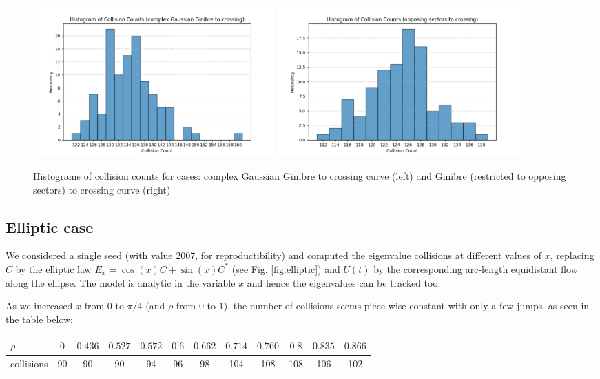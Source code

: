 \documentclass{article}
\begin{document}
\begin{enumerate}
		\begin{figure}[htbp]
			\centering
			\includegraphics[width=0.45\textwidth]{figures/ComplexGaussianToCrossing.pdf}
			\includegraphics[width=0.45\textwidth]{figures/Opposing-sectors-to-crossing.pdf}	
			\caption{Histograms of collision counts for cases: complex Gaussian Ginibre 
			to crossing curve (left) and 
			Ginibre (restricted to opposing sectors) to crossing curve (right)}
			\label{fig:pdf_image}
		\end{figure}

	\end{enumerate}		

	\subsection {Elliptic case}

	We considered a single seed (with value 2007, for reproductibility) and computed the eigenvalue collisions 
	at different values of $x$,
	replacing $C$ by the elliptic law $E_x = \cos(x) C + \sin(x) C^*$ (see Fig. \ref{fig:elliptic}) 
	and $U(t)$ by the corresponding 
	arc-length equidistant flow along the ellipse. 
	The model is analytic in the variable $x$ and hence the eigenvalues can be tracked too.
	
	As we increased $x$ from $0$ to $\pi/4$ (and $\rho$ from $0$ to $1$), 
	the number of collisions seems piece-wise constant with only a few jumps, 
	as seen in the table below:
	
	\vspace{1em}
	\begin{center}
	\begin{tabular}{l | c c c c c c c c c c c}
		$\rho$ & $0$ & $0.436$ & $0.527$ & $0.572$ & $0.6$ & $0.662$ & $0.714$ & $0.760$  & $0.8$ & $0.835$ & $0.866$ \\
		\hline
		collisions & 90 & 90 & 90 & 94 & 96 & 98 & 104 & 108 & 108 & 106 & 102 \\
	\end{tabular}
	\end{center}
	\vspace{1em}
\end{document}
